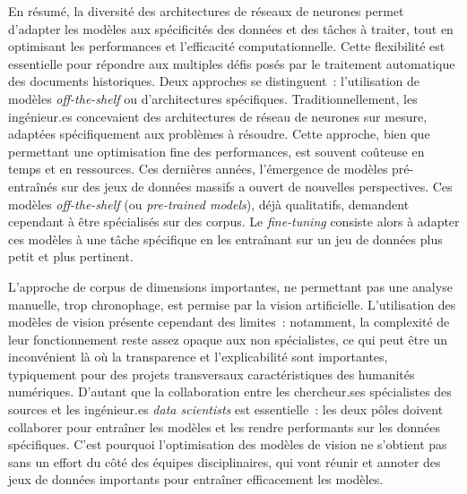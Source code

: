 \vspace{2cm}

En résumé, la diversité des architectures de réseaux de neurones permet
d'adapter les modèles aux spécificités des données et des tâches à
traiter, tout en optimisant les performances et l'efficacité
computationnelle. Cette flexibilité est essentielle pour répondre aux
multiples défis posés par le traitement automatique des documents
historiques. Deux approches se distinguent~: l'utilisation de modèles
\textit{off-the-shelf} ou d'architectures spécifiques. Traditionnellement, les
ingénieur.es concevaient des architectures de réseau de neurones sur
mesure, adaptées spécifiquement aux problèmes à résoudre. Cette
approche, bien que permettant une optimisation fine des performances,
est souvent coûteuse en temps et en ressources. Ces dernières années,
l'émergence de modèles pré-entraînés sur des jeux de données massifs a
ouvert de nouvelles perspectives. Ces modèles \textit{off-the-shelf} (ou
\textit{pre-trained models}), déjà qualitatifs, demandent cependant à être spécialisés sur des corpus. Le \textit{fine-tuning}
consiste alors à adapter ces modèles à une tâche spécifique en les
entraînant sur un jeu de données plus petit et plus pertinent.

L'approche de corpus de dimensions importantes, ne permettant pas une analyse
manuelle, trop chronophage, est permise par la vision artificielle.
L'utilisation des modèles de vision présente cependant des limites~:
notamment, la complexité de leur fonctionnement reste assez opaque aux
non spécialistes, ce qui peut être un inconvénient là où la transparence
et l'explicabilité sont importantes, typiquement pour des projets
transversaux caractéristiques des humanités numériques. D'autant que la
collaboration entre les chercheur.ses spécialistes des sources et les
ingénieur.es \textit{data scientists} est essentielle~: les deux pôles doivent
collaborer pour entraîner les modèles et les rendre performants sur les
données spécifiques. C'est pourquoi l'optimisation des modèles de vision
ne s'obtient pas sans un effort du côté des équipes disciplinaires, qui
vont réunir et annoter des jeux de données importants pour entraîner
efficacement les modèles.